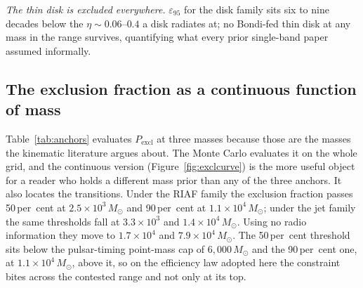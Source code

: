 \documentclass[11pt]{article}
\newcommand{\msun}{\ensuremath{M_\odot}}
\newcommand{\epsl}{\ensuremath{\varepsilon_{95}}}
\begin{document}
\emph{The thin disk is excluded everywhere.} $\epsl$ for the disk family sits six to nine decades below the $\eta \sim 0.06$--$0.4$ a disk radiates at; no Bondi-fed thin disk at any mass in the range survives, quantifying what every prior single-band paper assumed informally.

\subsection{The exclusion fraction as a continuous function of mass}
\label{sec:exclcurve}

Table~\ref{tab:anchors} evaluates $P_{\mathrm{excl}}$ at three masses because those are the masses the kinematic literature argues about. The Monte Carlo evaluates it on the whole grid, and the continuous version (Figure~\ref{fig:exclcurve}) is the more useful object for a reader who holds a different mass prior than any of the three anchors. It also locates the transitions. Under the RIAF family the exclusion fraction passes 50\,per~cent at $2.5\times10^{3}\,\msun$ and 90\,per~cent at $1.1\times10^{4}\,\msun$; under the jet family the same thresholds fall at $3.3\times10^{3}$ and $1.4\times10^{4}\,\msun$. Using no radio information they move to $1.7\times10^{4}$ and $7.9\times10^{4}\,\msun$. The 50\,per~cent threshold sits below the pulsar-timing point-mass cap of $6{,}000\,\msun$ and the 90\,per~cent one, at $1.1\times10^{4}\,\msun$, above it, so on the efficiency law adopted here the constraint bites across the contested range and not only at its top.
\end{document}
